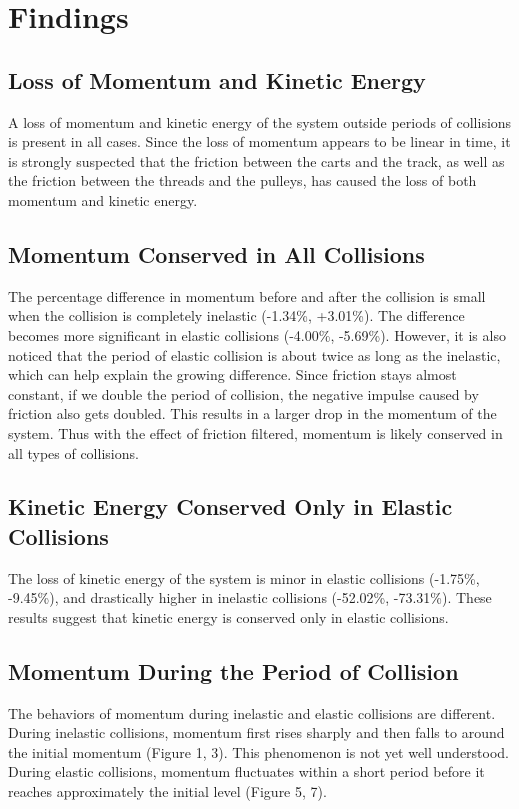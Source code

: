 \section{Findings}
\subsection{Loss of Momentum and Kinetic Energy}
A loss of momentum and kinetic energy of the system outside periods of collisions is present in all cases. Since the loss of momentum appears to be linear in time, it is strongly suspected that the friction between the carts and the track, as well as the friction between the threads and the pulleys, has caused the loss of both momentum and kinetic energy.
\subsection{Momentum Conserved in All Collisions}
The percentage difference in momentum before and after the collision is small when the collision is completely inelastic (-1.34\%, +3.01\%). The difference becomes more significant in elastic collisions (-4.00\%, -5.69\%). However, it is also noticed that the period of elastic collision is about twice as long as the inelastic, which can help explain the growing difference. Since friction stays almost constant, if we double the period of collision, the negative impulse caused by friction also gets doubled. This results in a larger drop in the momentum of the system. Thus with the effect of friction filtered, momentum is likely conserved in all types of collisions.

\subsection{Kinetic Energy Conserved Only in Elastic Collisions}
The loss of kinetic energy of the system is minor in elastic collisions (-1.75\%, -9.45\%), and drastically higher in inelastic collisions (-52.02\%, -73.31\%). These results suggest that kinetic energy is conserved only in elastic collisions.
\subsection{Momentum During the Period of Collision}
The behaviors of momentum during inelastic and elastic collisions are different. During inelastic collisions, momentum first rises sharply and then falls to around the initial momentum (Figure 1, 3). This phenomenon is not yet well understood. During elastic collisions, momentum fluctuates within a short period before it reaches approximately the initial level (Figure 5, 7).

